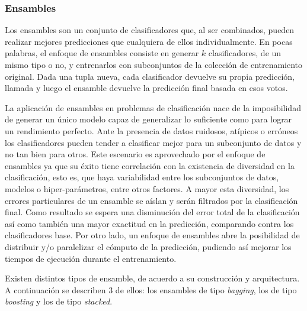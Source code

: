 

\subsubsection{Ensambles}

Los ensambles son un conjunto de clasificadores que, al ser combinados, pueden
realizar mejores predicciones que cualquiera de ellos individualmente. En pocas
palabras, el enfoque de ensambles consiste en generar $k$ clasificadores, de un
mismo tipo o no, y entrenarlos con subconjuntos de la colección de entrenamiento
original. Dada una tupla nueva, cada clasificador devuelve su propia predicción,
llamada  y luego el ensamble devuelve la predicción final basada
en esos votos.

La aplicación de ensambles en problemas de clasificación nace de la
imposibilidad de generar un único modelo capaz de generalizar lo suficiente como
para lograr un rendimiento perfecto. Ante la presencia de datos ruidosos,
atípicos o erróneos los clasificadores pueden tender a clasificar mejor para un
subconjunto de datos y no tan bien para otros. Este escenario es aprovechado por
el enfoque de ensambles ya que su éxito tiene correlación con la existencia de
diversidad en la clasificación, esto es, que haya variabilidad entre los
subconjuntos de datos, modelos o hiper-parámetros, entre otros factores. A mayor
esta diversidad, los errores particulares de un ensamble se aíslan y serán
filtrados por la clasificación final. Como resultado se espera una disminución
del error total de la clasificación así como también una mayor exactitud en la
predicción, comparando contra los clasificadores base. Por otro lado, un enfoque
de ensambles abre la posibilidad de distribuir y/o paralelizar el cómputo de la
predicción, pudiendo así mejorar los tiempos de ejecución durante el
entrenamiento.

Existen distintos tipos de ensamble, de acuerdo a su construcción y
arquitectura. A continuación se describen 3 de ellos: los ensambles de tipo
\textit{bagging}, los de tipo \textit{boosting} y los de tipo \textit{stacked}. 

